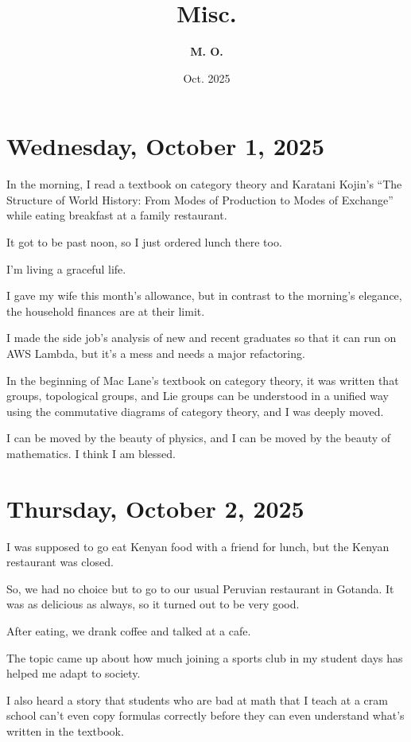 \documentclass[uplatex]{jsarticle}
\title{
\textbf{Misc.}
}
\author{
\textbf{M. O.}
}
\date{Oct. 2025}
\begin{document}
\maketitle

\section{\textbf{Wednesday, October 1, 2025}}

In the morning, I read a textbook on category theory and Karatani Kojin's ``The Structure of World History: From Modes of Production to Modes of Exchange'' while eating breakfast at a family restaurant.

It got to be past noon, so I just ordered lunch there too.

I'm living a graceful life.

I gave my wife this month's allowance, but in contrast to the morning's elegance, the household finances are at their limit.

I made the side job's analysis of new and recent graduates so that it can run on AWS Lambda, but it's a mess and needs a major refactoring.

In the beginning of Mac Lane's textbook on category theory, it was written that groups, topological groups, and Lie groups can be understood in a unified way using the commutative diagrams of category theory, and I was deeply moved.

I can be moved by the beauty of physics, and I can be moved by the beauty of mathematics. I think I am blessed.


\section{\textbf{Thursday, October 2, 2025}}

I was supposed to go eat Kenyan food with a friend for lunch, but the Kenyan restaurant was closed.

So, we had no choice but to go to our usual Peruvian restaurant in Gotanda. It was as delicious as always, so it turned out to be very good.

After eating, we drank coffee and talked at a cafe.

The topic came up about how much joining a sports club in my student days has helped me adapt to society.

I also heard a story that students who are bad at math that I teach at a cram school can't even copy formulas correctly before they can even understand what's written in the textbook.
\end{document}
